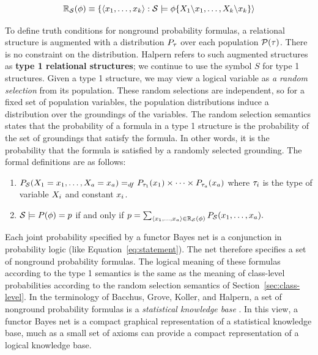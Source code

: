 \documentclass[oribibl]{llncs}
\begin{document}
\[
\mathbb{R}_{\mathcal{S}}(\phi) \equiv \{\langle x_{1}, \ldots, x_{k} \rangle: \mathcal{S} \models \phi \{X_{1}\backslash x_{1},\ldots,X_{k} \backslash x_{k}\}  \rangle 
\]

To define truth conditions for nonground probability formulas, a relational structure is augmented with a distribution $P_{\tau}$ over each population $\mathcal{P}(\tau)$.  There is no constraint on the distribution. Halpern refers to such augmented structures as \textbf{type 1 relational structures}; we continue to use the symbol $S$ for type 1 structures.
Given a type 1 structure, we may view a logical variable as {\em a random selection} from its population. These random selections are independent, so for a fixed set of population variables, the population distributions induce a distribution over the groundings of the variables. The random selection semantics states that the probability of a formula in a type 1 structure is the probability of the set of groundings that satisfy the formula. In other words, it is the probability that the formula is satisfied by a randomly selected grounding. The formal definitions are as follows:


\begin{enumerate}
\item $P_{\mathcal{S}}(X_{1} = x_{1},\ldots,X_{a} = x_{a}) =_{df} P_{\tau_{1}}(x_{1}) \times \cdots \times P_{\tau_{a}}(x_{a})$
where $\tau_{i}$ is the type of variable $X_{i}$ and constant $x_{i}$.
\item $\mathcal{S} \models P(\phi) = p$ if and only if $p = \sum_{\langle x_{1},\ldots,x_{a} \rangle \in \mathbb{R}_{\mathcal{S}}(\phi)} P_{\mathcal{S}} (x_{1},\ldots,x_{a}). $
\end{enumerate}

Each joint probability specified by a functor Bayes net is a conjunction in probability logic (like Equation~\ref{eq:statement}). The net therefore specifies a set of nonground probability formulas. The logical meaning of these formulas according to the type 1 semantics is the same as the meaning of class-level probabilities according to the random selection semantics of Section~\ref{sec:class-level}. In the terminology of Bacchus, Grove, Koller, and Halpern, a set of nonground probability formulas is a {\em statistical knowledge base} \cite{Bacchus1992}. In this view, a functor Bayes net is a compact graphical representation of a statistical knowledge base, much as a small set of axioms can provide a compact representation of a logical knowledge base.
\end{document}
